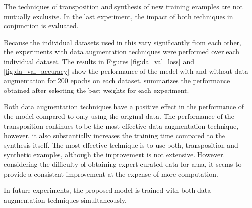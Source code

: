 
The techniques of transposition and synthesis of new
training examples are not mutually exclusive. In the last
experiment, the impact of both techniques in conjunction is
evaluated.

Because the individual datasets used in this \thesisdiss{}
vary significantly from each other, the experiments with
data augmentation techniques were performed over each
individual dataset. The results in Figures
\ref{fig:da_val_loss} and \ref{fig:da_val_accuracy} show the
performance of the model with and without data augmentation
for 200 epochs on each dataset. 
summarizes the performance obtained after selecting the best
weights for each experiment.




 Both data augmentation techniques have a positive effect in
 the performance of the model compared to only using the
 original data. The performance of the transposition
 continues to be the most effective data-augmentation
 technique, however, it also substantially increases the
 training time compared to the synthesis itself. The most
 effective technique is to use both, transposition and
 synthetic examples, although the improvement is not
 extensive. However, considering the difficulty of obtaining
 expert-curated data for \gls{arna}, it seems to provide a
 consistent improvement at the expense of more computation.

 In future experiments, the proposed model is trained with
 both data augmentation techniques simultaneously.
